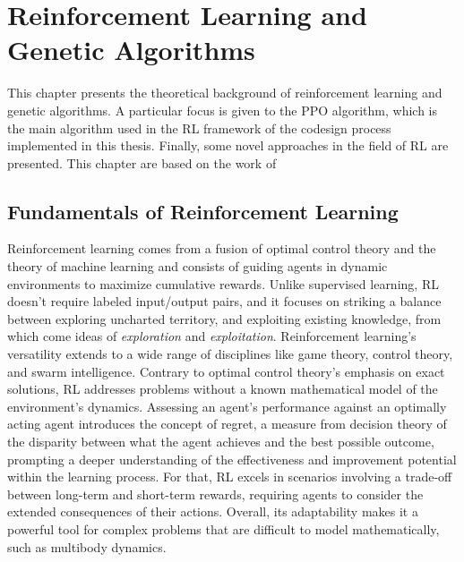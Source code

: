 \chapter{Reinforcement Learning and Genetic Algorithms}
\label{chp:back_RLGA}

This chapter presents the theoretical background of reinforcement learning and genetic algorithms. A particular focus is given to the \ac{PPO} algorithm, which is the main algorithm used in the \ac{RL} framework of the codesign process implemented in this thesis. Finally, some novel approaches in the field of \ac{RL} are presented. This chapter are based on the work of \citet{sutton_reinforcement_1998,li_deep_2018,agarwal_deep_2022,holland_1992_ga}

\section{Fundamentals of Reinforcement Learning}

Reinforcement learning comes from a fusion of optimal control theory and the theory of machine learning and consists of guiding agents in dynamic environments to maximize cumulative rewards. Unlike supervised learning, \ac{RL} doesn't require labeled input/output pairs, and it focuses on striking a balance between exploring uncharted territory, and exploiting existing knowledge, from which come ideas of \textit{exploration} and \textit{exploitation}. Reinforcement learning's versatility extends to a wide range of disciplines like game theory, control theory, and swarm intelligence. Contrary to optimal control theory's emphasis on exact solutions, \ac{RL} addresses problems without a known mathematical model of the environment's dynamics. Assessing an agent's performance against an optimally acting agent introduces the concept of regret, a measure from decision theory of the disparity between what the agent achieves and the best possible outcome, prompting a deeper understanding of the effectiveness and improvement potential within the learning process. For that, \ac{RL} excels in scenarios involving a trade-off between long-term and short-term rewards, requiring agents to consider the extended consequences of their actions. Overall, its adaptability makes it a powerful tool for complex problems that are difficult to model mathematically, such as multibody dynamics.

